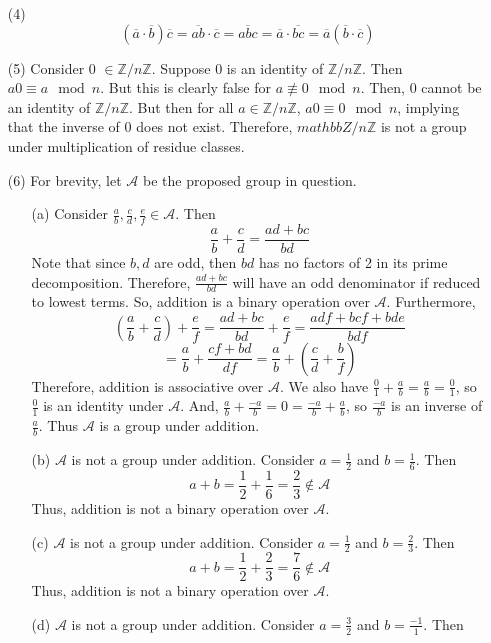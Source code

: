 \documentclass[12pt]{article}
\begin{document}
\begin{itemize}
\item[(4)]
$$(\overline{a} \cdot \overline{b})\overline{c} = \overline{ab} \cdot \overline{c} = \overline{abc} = \overline{a} \cdot \overline{bc} = \overline{a}(\overline{b} \cdot \overline{c})$$
\item[(5)]
Consider 0 $\in \mathbb{Z}/n\mathbb{Z}$. Suppose 0 is an identity of $\mathbb{Z}/n\mathbb{Z}$. Then $a0 \equiv a \mod n$. But this is clearly false for $a \not \equiv 0 \mod n$. Then, 0 cannot be an identity of $\mathbb{Z}/n\mathbb{Z}$. But then for all $a \in \mathbb{Z}/n\mathbb{Z}$, $a0 \equiv 0 \mod n$, implying that the inverse of 0 does not exist. Therefore, $mathbb{Z}/n\mathbb{Z}$ is not a group under multiplication of residue classes.
\item[(6)]
For brevity, let $\mathcal{A}$ be the proposed group in question.
\begin{itemize}
\item[(a)]
Consider $\frac{a}{b}, \frac{c}{d}, \frac{e}{f} \in \mathcal{A}$. Then
$$\frac{a}{b} + \frac{c}{d} = \frac{ad + bc}{bd}$$
Note that since $b, d$ are odd, then $bd$ has no factors of 2 in its prime decomposition. Therefore, $\frac{ad + bc}{bd}$ will have an odd denominator if reduced to lowest terms. So, addition is a binary operation over $\mathcal{A}$. Furthermore, 
$$\left(\frac{a}{b} + \frac{c}{d} \right) + \frac{e}{f} = \frac{ad + bc}{bd} + \frac{e}{f} = \frac{adf + bcf + bde}{bdf}$$
$$ = \frac{a}{b} + \frac{cf + bd}{df} = \frac{a}{b} + \left(\frac{c}{d} + \frac{b}{f}\right)$$
Therefore, addition is associative over $\mathcal{A}$. We also have $\frac{0}{1} + \frac{a}{b} = \frac{a}{b} = \frac{0}{1}$, so $\frac{0}{1}$ is an identity under $\mathcal{A}$. And, $\frac{a}{b} + \frac{-a}{b} = 0 = \frac{-a}{b} + \frac{a}{b}$, so $\frac{-a}{b}$ is an inverse of $\frac{a}{b}$. Thus $\mathcal{A}$ is a group under addition.
\item[(b)]$\mathcal{A}$ is not a group under addition. Consider $a = \frac{1}{2}$ and $b = \frac{1}{6}$. Then
$$a + b = \frac{1}{2} + \frac{1}{6} = \frac{2}{3} \not \in \mathcal{A}$$
Thus, addition is not a binary operation over $\mathcal{A}$.
\item[(c)]$\mathcal{A}$ is not a group under addition. Consider $a = \frac{1}{2}$ and $b = \frac{2}{3}$. Then
$$a + b = \frac{1}{2} + \frac{2}{3} = \frac{7}{6} \not \in \mathcal{A}$$
Thus, addition is not a binary operation over $\mathcal{A}$.
\item[(d)]
$\mathcal{A}$ is not a group under addition. Consider $a = \frac{3}{2}$ and $b = \frac{-1}{1}$. Then

\end{itemize}
\end{itemize}
\end{document}
